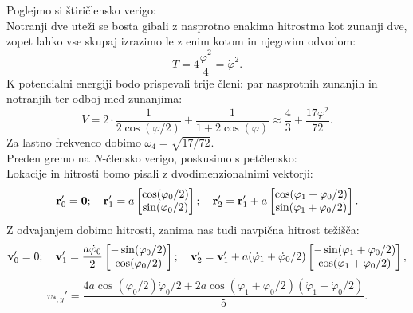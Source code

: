 \documentclass{article}
\begin{document}
Poglejmo si štiričlensko verigo:\\
Notranji dve uteži se bosta gibali z nasprotno enakima hitrostma kot zunanji dve, zopet lahko vse skupaj izrazimo le z enim kotom in njegovim odvodom:
\begin{equation}
    T=4\frac{\dot{\varphi}^2}{4}=\dot{\varphi}^2.
\end{equation}
K potencialni energiji bodo prispevali trije členi: par nasprotnih zunanjih in notranjih ter odboj med zunanjima:
\begin{equation}
    V=2\cdot\frac{1}{2\cos(\varphi/2)}+\frac{1}{1+2\cos(\varphi)}\approx\frac{4}{3}+\frac{17\varphi^2}{72}.
\end{equation}
Za lastno frekvenco dobimo $\omega_4=\sqrt{17/72}$.\\

Preden gremo na $N$-člensko verigo, poskusimo s petčlensko:\\
Lokacije in hitrosti bomo pisali z dvodimenzionalnimi vektorji:
\begin{equation}
    \mathbf{r}_0'=\mathbf{0};\quad\mathbf{r}_1'=a\begin{bmatrix}
        \cos(\varphi_0/2)\\
        \sin(\varphi_0/2)
    \end{bmatrix};\quad\mathbf{r}_2'=\mathbf{r}_1'+a\begin{bmatrix}
        \cos(\varphi_1+\varphi_0/2)\\
        \sin(\varphi_1+\varphi_0/2)
    \end{bmatrix}.
\end{equation}
Z odvajanjem dobimo hitrosti, zanima nas tudi navpična hitrost težišča:
\begin{equation}
    \mathbf{v}_0'=0;\quad\mathbf{v}_1'=\frac{a\dot{\varphi}_0}{2}\begin{bmatrix}
        -\sin(\varphi_0/2)\\
        \cos(\varphi_0/2)
    \end{bmatrix};\quad\mathbf{v}_2'=\mathbf{v}_1'+a(\dot{\varphi}_1+\dot{\varphi}_0/2)\begin{bmatrix}
        -\sin(\varphi_1+\varphi_0/2)\\
        \cos(\varphi_1+\varphi_0/2)
    \end{bmatrix},
\end{equation}
\begin{equation}
    v_{*,y}'=\frac{4a\cos(\varphi_0/2)\dot{\varphi}_0/2+2a\cos(\varphi_1+\varphi_0/2)(\dot{\varphi}_1+\dot{\varphi}_0/2)}{5}.
\end{equation}
\end{document}
